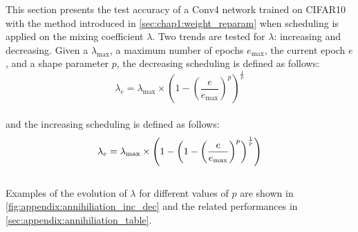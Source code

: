This section presents the test accuracy of a Conv4 network trained on CIFAR10
with the method introduced in \cref{sec:chap1:weight_reparam} when scheduling is
applied on the mixing coefficient $\lambda$. Two trends are tested for
$\lambda$: increasing and decreasing. Given a $\lambda_\text{max}$, a maximum
number of epochs $e_\text{max}$, the current epoch $e$, and a shape parameter
$p$, the decreasing scheduling is defined as follows:\\
$$
\lambda_e = \lambda_\text{max} \times \left(1 - \left(\frac{e}{e_\text{max}}\right)^p\right)^\frac{1}{p}
$$\\
and the increasing scheduling is defined as follows:\\
$$\\
\lambda_e = \lambda_\text{max} \times \left( 1- \left(1 - \left(\frac{e}{e_\text{max}}\right)^p\right)^\frac{1}{p} \right)
$$\\
Examples of the evolution of $\lambda$ for different values of $p$ are shown in
\cref{fig:appendix:annihiliation_inc_dec} and the related performances in
\cref{sec:appendix:annihiliation_table}.\\

